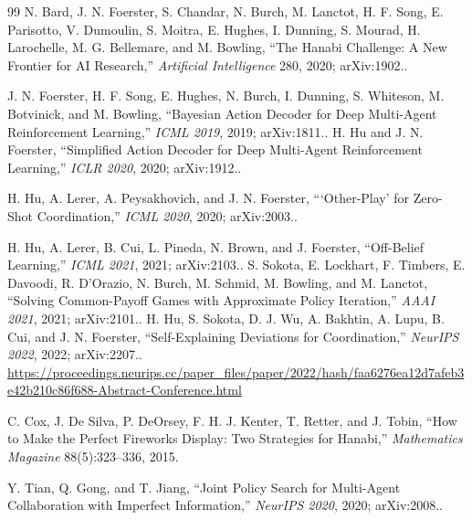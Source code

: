\begin{thebibliography}{99}
N. Bard, J. N. Foerster, S. Chandar, N. Burch, M. Lanctot, H. F. Song,
E. Parisotto, V. Dumoulin, S. Moitra, E. Hughes, I. Dunning, S. Mourad,
H. Larochelle, M. G. Bellemare, and M. Bowling, ``The Hanabi Challenge: A New
Frontier for AI Research,'' \emph{Artificial Intelligence} 280, 2020;
arXiv:1902..

J. N. Foerster, H. F. Song, E. Hughes, N. Burch, I. Dunning, S. Whiteson,
M. Botvinick, and M. Bowling, ``Bayesian Action Decoder for Deep Multi-Agent
Reinforcement Learning,'' \emph{ICML 2019}, 2019; arXiv:1811..
H. Hu and J. N. Foerster, ``Simplified Action Decoder for Deep Multi-Agent
Reinforcement Learning,'' \emph{ICLR 2020}, 2020; arXiv:1912..

H. Hu, A. Lerer, A. Peysakhovich, and J. N. Foerster, ```Other-Play' for
Zero-Shot Coordination,'' \emph{ICML 2020}, 2020; arXiv:2003..

H. Hu, A. Lerer, B. Cui, L. Pineda, N. Brown, and J. Foerster, ``Off-Belief
Learning,'' \emph{ICML 2021}, 2021; arXiv:2103..
S. Sokota, E. Lockhart, F. Timbers, E. Davoodi, R. D'Orazio, N. Burch,
M. Schmid, M. Bowling, and M. Lanctot, ``Solving Common-Payoff Games with
Approximate Policy Iteration,'' \emph{AAAI 2021}, 2021; arXiv:2101..
H. Hu, S. Sokota, D. J. Wu, A. Bakhtin, A. Lupu, B. Cui, and J. N. Foerster,
``Self-Explaining Deviations for Coordination,'' \emph{NeurIPS 2022}, 2022;
arXiv:2207..\\
\url{https://proceedings.neurips.cc/paper_files/paper/2022/hash/faa6276ea12d7afeb3e42b210c86f688-Abstract-Conference.html}

C. Cox, J. De Silva, P. DeOrsey, F. H. J. Kenter, T. Retter, and J. Tobin, ``How
to Make the Perfect Fireworks Display: Two Strategies for Hanabi,''
\emph{Mathematics Magazine} 88(5):323--336, 2015.

Y. Tian, Q. Gong, and T. Jiang, ``Joint Policy Search for Multi-Agent
Collaboration with Imperfect Information,'' \emph{NeurIPS 2020}, 2020;
arXiv:2008..


\end{thebibliography}
